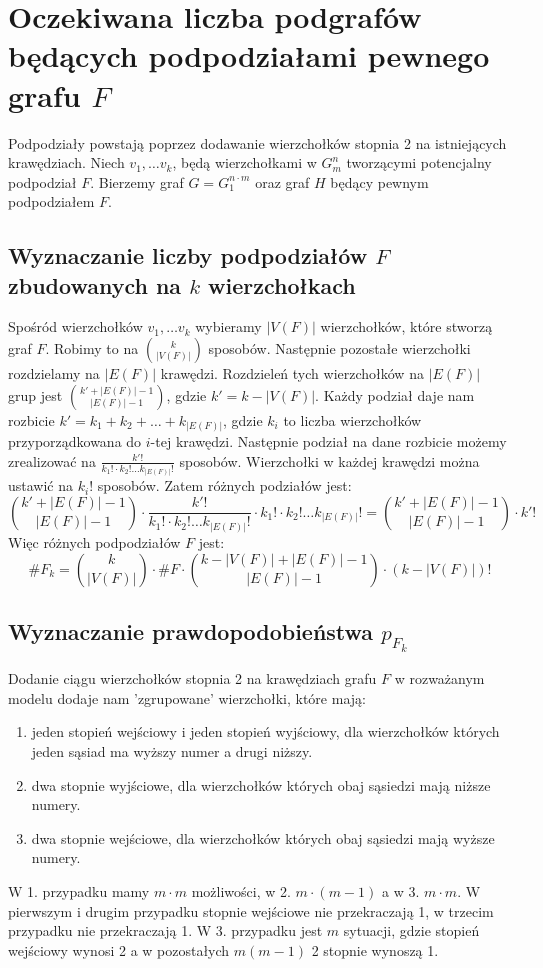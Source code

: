 \documentclass{article}
\begin{document}
\newpage

\section{Oczekiwana liczba podgrafów będących podpodziałami pewnego grafu $F$}
Podpodziały powstają poprzez dodawanie wierzchołków stopnia 2 na istniejących krawędziach.
\newline
Niech $v_1, \ldots v_k$, będą wierzchołkami w $G_m^n$ tworzącymi potencjalny podpodział $F$.
Bierzemy graf $G = G_1^{n \cdot m}$ oraz graf  $H$ będący pewnym podpodziałem $F$.
\subsection{Wyznaczanie liczby podpodziałów $F$ zbudowanych na $k$ wierzchołkach}
Spośród wierzchołków $v_1, \ldots v_k$ wybieramy $|V(F)|$ wierzchołków, które stworzą graf $F$. Robimy to na $\binom{k}{|V(F)|}$ sposobów.
Następnie pozostałe wierzchołki rozdzielamy na $|E(F)|$ krawędzi. Rozdzieleń tych wierzchołków na $|E(F)|$ grup jest $\binom{k'+|E(F)|-1}{|E(F)|-1}$, gdzie $k' = k-|V(F)|$. Każdy podział daje nam rozbicie $k'=k_1 + k_2 + \ldots + k_{|E(F)|}$, gdzie $k_i$ to liczba wierzchołków przyporządkowana do $i$-tej krawędzi.
Następnie podział na dane rozbicie możemy zrealizować na $\frac{k'!}{k_1! \cdot k_2! \ldots k_{|E(F)|}!}$ sposobów.
Wierzchołki w każdej krawędzi można ustawić na $k_i!$ sposobów. Zatem różnych podziałów jest:
\begin{dmath}
  \binom{k'+|E(F)|-1}{|E(F)|-1} \cdot \frac{k'!}{k_1! \cdot k_2! \ldots k_{|E(F)|}!} \cdot k_1! \cdot k_2! \ldots k_{|E(F)|}! = \binom{k'+|E(F)|-1}{|E(F)|-1} \cdot k'!
\end{dmath}
Więc różnych podpodziałów $F$ jest:
\begin{dmath}
 \#F_k = \binom{k}{|V(F)|} \cdot \#F \cdot \binom{k-|V(F)|+|E(F)|-1}{|E(F)|-1} \cdot (k-|V(F)|)!
\end{dmath}

\subsection{Wyznaczanie prawdopodobieństwa $p_{F_k}$}
Dodanie ciągu wierzchołków stopnia 2 na krawędziach grafu $F$ w rozważanym modelu dodaje nam 'zgrupowane' wierzchołki, które mają:
\begin{enumerate}
  \item jeden stopień wejściowy i jeden stopień wyjściowy, dla wierzchołków których jeden sąsiad ma wyższy numer a drugi niższy.
  \item dwa stopnie wyjściowe, dla wierzchołków których obaj sąsiedzi mają niższe numery.
  \item dwa stopnie wejściowe, dla wierzchołków których obaj sąsiedzi mają wyższe numery.
\end{enumerate}
W 1. przypadku mamy $m \cdot m$ możliwości, w 2. $m \cdot (m-1)$ a w 3. $m \cdot m$. W pierwszym i drugim przypadku stopnie wejściowe nie przekraczają 1, w trzecim przypadku nie przekraczają 1. W 3. przypadku jest $m$ sytuacji, gdzie stopień wejściowy wynosi 2 a w pozostałych $m(m-1)$ 2 stopnie wynoszą 1.
\end{document}
